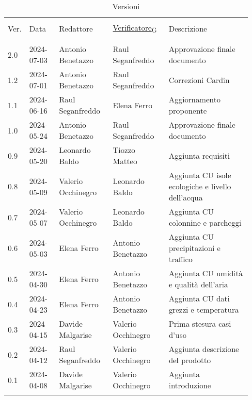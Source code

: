 \documentclass[12pt]{article}
\begin{document}


\newpage



\captionsetup[table]{list=no}
\begin{table}[!h]
	\footnotesize
	\begin{center}
		\caption*{Versioni}
		\vspace{0.5cm}
		\begin{tabular}{ l l l l p{6.1cm} }
			\hline                                                                                                          \\[-2ex]
			Ver. & Data & Redattore & \href{https://7last.github.io/docs/pb/documentazione-interna/glossario\#verificatore}{Verificatore\textsubscript{G}} & Descrizione\\
			\\[-2ex] \hline \\[-1.5ex]
			2.0 & 2024-07-03 & Antonio Benetazzo  & Raul Seganfreddo   & Approvazione finale documento\\
			1.2 & 2024-07-01 & Antonio Benetazzo  & Raul Seganfreddo   & Correzioni Cardin\\
			1.1 & 2024-06-16 & Raul Seganfreddo   & Elena Ferro        & Aggiornamento proponente\\
			1.0 & 2024-05-24 & Antonio Benetazzo  & Raul Seganfreddo   & Approvazione finale documento\\
			0.9 & 2024-05-20 & Leonardo Baldo     & Tiozzo Matteo      & Aggiunta requisiti\\
			0.8 & 2024-05-09 & Valerio Occhinegro & Leonardo Baldo     & Aggiunta CU isole ecologiche e livello dell'acqua \\
			0.7 & 2024-05-07 & Valerio Occhinegro & Leonardo Baldo     & Aggiunta CU colonnine e parcheggi\\
			0.6 & 2024-05-03 & Elena Ferro        & Antonio Benetazzo  & Aggiunta CU precipitazioni e traffico\\
			0.5 & 2024-04-30 & Elena Ferro        & Antonio Benetazzo  & Aggiunta CU umidità e qualità dell'aria\\
			0.4 & 2024-04-23 & Elena Ferro        & Antonio Benetazzo  & Aggiunta CU dati grezzi e temperatura\\
			0.3 & 2024-04-15 & Davide Malgarise   & Valerio Occhinegro & Prima stesura casi d'uso\\
			0.2 & 2024-04-12 & Raul Seganfreddo   & Valerio Occhinegro & Aggiunta descrizione del prodotto \\
			0.1 & 2024-04-08 & Davide Malgarise   & Valerio Occhinegro & Aggiunta introduzione \\
			\\[-1.5ex] \hline
		\end{tabular}
	\end{center}
\end{table}
\captionsetup[table]{list=yes}

\newpage

\tableofcontents
\listoftables
\listoffigures

\newpage



\newpage



\newpage



\newpage


\end{document}
